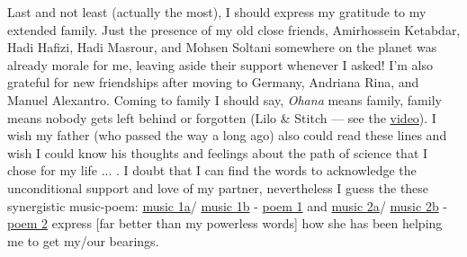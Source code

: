 Last and not least (actually the most), I should express my gratitude to my extended family.
Just the presence of my old close friends, Amirhossein Ketabdar, Hadi Hafizi, Hadi Masrour, and Mohsen Soltani somewhere on the planet was already morale for me,
leaving aside their support whenever I asked!
I'm also grateful for new friendships after moving to Germany, Andriana Rina, and Manuel Alexantro.
Coming to family I should say, \emph{Ohana} means family,
family means nobody gets left behind or forgotten
(Lilo \& Stitch --- see the \href{https://www.youtube.com/watch?v=-U0xGBNl2fE}{video}).
I wish my father (who passed the way a long ago) also could read these lines and
wish I could  know his thoughts and feelings about the path of science that I chose for my life ... . 
I doubt that I can find the words to acknowledge the unconditional support and love of my partner,
nevertheless I guess the these synergistic music-poem:
\href{https://www.youtube.com/watch?v=HU9vCVTLuhM}{music 1a}/
\href{https://www.youtube.com/watch?v=xf4dRiLAis4}{music 1b} -
\href{http://www.nosokhan.com/library/Topic/125O}{poem 1}
and
\href{https://www.youtube.com/watch?v=pNzFf-tfc3k}{music 2a}/
\href{https://www.aparat.com/v/o8XUh/%D8%AD%D8%B3%DB%8C%D9%86_%D8%B9%D9%84%DB%8C%D8%B2%D8%A7%D8%AF%D9%87_%D9%88_%D9%85%D8%AD%D9%85%D8%AF_%D9%85%D8%B9%D8%AA%D9%85%D8%AF%DB%8C_-_%D8%A8%DB%8C%D8%A7_%D8%AA%D8%A7_%DA%AF%D9%84_%D8%A8%D8%B1%D8%A7%D9%81%D8%B4%D8%A7%D9%86%DB%8C%D9%85}{music 2b} -
\href{https://fa.wikisource.org/wiki/%D8%AF%DB%8C%D9%88%D8%A7%D9%86_%D8%AD%D8%A7%D9%81%D8%B8/%D8%A8%DB%8C%D8%A7_%D8%AA%D8%A7_%DA%AF%D9%84_%D8%A8%D8%B1_%D8%A7%D9%81%D8%B4%D8%A7%D9%86%DB%8C%D9%85_%D9%88_%D9%85%DB%8C_%D8%AF%D8%B1_%D8%B3%D8%A7%D8%BA%D8%B1_%D8%A7%D9%86%D8%AF%D8%A7%D8%B2%DB%8C%D9%85}{poem 2}
express [far better than my powerless words] how she has been helping me to get my/our bearings.



